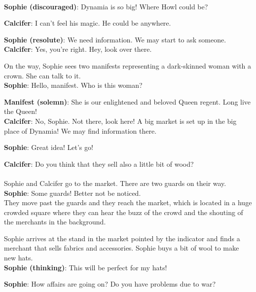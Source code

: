 \noindent \\

\textbf{Sophie (discouraged)}: Dynamia is so big! Where Howl could be?

\textbf{Calcifer}: I can’t feel his magic. He could be anywhere.

\textbf{Sophie (resolute)}: We need information. We may start to ask someone.\\

\textbf{Calcifer}: Yes, you're right. Hey, look over there.

\noindent On the way, Sophie sees two manifests representing a dark-skinned woman with a crown. She can talk to it.\\

\textbf{Sophie}: Hello, manifest. Who is this woman?

\textbf{Manifest (solemn)}: She is our enlightened and beloved Queen regent. Long live the Queen!\\

\textbf{Calcifer}: No, Sophie. Not there, look here! A big market is set up in the big place of Dynamia! We may find information there.

\textbf{Sophie}: Great idea! Let's go!

\textbf{Calcifer}: Do you think that they sell also a little bit of wood?\\

\\

\noindent Sophie and Calcifer go to the market. There are two guards on their way.\\

\textbf{Sophie}: Some guards! Better not be noticed.\\

\noindent They move past the guards and they reach the market, which is located in a huge crowded square where they can hear the buzz of the crowd and the shouting of the merchants in the background.


\noindent Sophie arrives at the stand in the market pointed by the indicator and finds a merchant that sells fabrics and accessories.
Sophie buys a bit of wool to make new hats.\\

\textbf{Sophie (thinking)}: This will be perfect for my hats!

\textbf{Sophie}: How affairs are going on? Do you have problems due to war?

